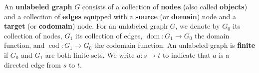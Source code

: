 \begin{definition}
    \label{def:graph:unlabeled}
    An \textbf{unlabeled graph} \( G \) consists of a collection of \textbf{nodes} (also called \textbf{objects}) and a collection of \textbf{edges} equipped with a \textbf{source} (or \textbf{domain}) node and a \textbf{target} (or \textbf{codomain}) node. 
    For an unlabeled graph \( G \), we denote by \( G_0 \) its collection of nodes, \( G_1 \) its collection of edges, \( \operatorname{dom}:G_1{\to}G_0 \) the domain function, and \( \operatorname{cod}:G_1{\to}G_0 \) the codomain function. An unlabeled graph is \textbf{finite} if \( G_0 \) and \( G_1 \) are both finite sets.
    We write \( a: s \mathop{\to} t \) to indicate that \( a \) is a directed edge from \( s \) to \( t \).
\end{definition}   
